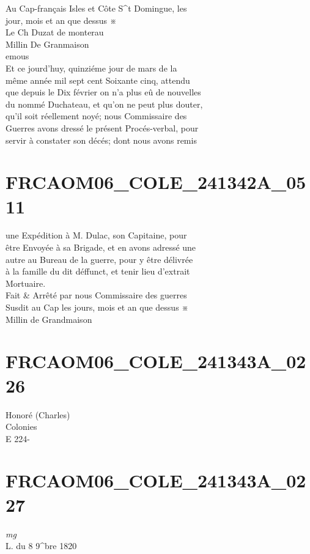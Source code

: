 \documentclass{article}
\begin{document}
\begin{pages}
Au Cap-français Isles et Côte S\^{}t Domingue, les\\
jour, mois et an que dessus ※\\
Le Ch Duzat de monterau\\
Millin De Granmaison\\
emous\\
Et ce jourd'huy, quinziéme jour de mars de la\\
même année mil sept cent Soixante cinq, attendu\\
que depuis le Dix février on n'a plus eû de nouvelles\\
du nommé Duchateau, et qu'on ne peut plus douter,\\
qu'il soit réellement noyé; nous Commissaire des\\
Guerres avons dressé le présent Procés-verbal, pour\\
servir à constater son décés; dont nous avons remis
\pend
\endnumbering\beginnumbering\section{FRCAOM06\_COLE\_241342A\_0511}\pstart
une Expédition à M. Dulac, son Capitaine, pour\\
être Envoyée à sa Brigade, et en avons adressé une\\
autre au Bureau de la guerre, pour y être délivrée\\
à la famille du dit déffunct, et tenir lieu d'extrait\\
Mortuaire.\\
Fait \& Arrêté par nous Commissaire des guerres\\
Susdit au Cap les jours, mois et an que dessus ※\\
Millin de Grandmaison
\pend
\endnumbering\beginnumbering\section{FRCAOM06\_COLE\_241343A\_0226}\pstart
Honoré (Charles)\\
Colonies\\
E 224-
\pend
\endnumbering\beginnumbering\section{FRCAOM06\_COLE\_241343A\_0227}
\vspace{0.5cm}\noindent
\textit{mg}
\footnotesize \\
L. du 8 9\^{}bre 1820\\

\end{pages}
\end{document}

